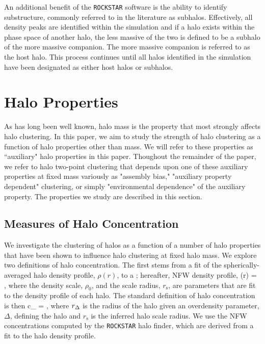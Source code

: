 \documentclass[usenatbib,fleqn]{mnras}
\begin{document}
An additional benefit of the {\tt ROCKSTAR} software is the ability to identify substructure, commonly referred to in the
literature as subhalos. Effectively, all density peaks are identified within the simulation and if a halo exists within the phase
space of another halo, the less massive of the two is defined to be a subhalo of the more massive companion. The more massive companion is 
referred to as the host halo. This process continues until all halos identified in the simulation have been designated as either host halos or subhalos.

\section{Halo Properties}
\label{section:haloprops}

As has long been well known, halo mass is the property that most strongly affects halo clustering. In 
this paper, we aim to study the strength of halo clustering as a function of halo properties other than 
mass. We will refer to these properties as ``auxiliary" halo properties in this paper. Thoughout the remainder of the paper, we refer to halo two-point clustering that depends upon one of these auxiliary properties at fixed mass variously as "assembly bias," "auxiliary property dependent" clustering, or simply "environmental dependence" of the auxiliary property. The properties 
we study are described in this section.

\subsection{Measures of Halo Concentration}

We investigate the clustering of halos as a function of a number of halo properties 
that have been shown to influence halo clustering at fixed halo mass. We explore 
two definitions of halo concentration. The first stems from a fit of the spherically-averaged 
halo density profile, $\rho(r)$, to a \citet{navarro_etal97}; hereafter, NFW density profile, 
%
\beq
\rho(r) = ,
\eeq
%
where the density scale, $\rho_0$, and the scale radius, $r_{\mathrm{s}}$, are parameters 
that are fit to the density profile of each halo. The standard definition of halo concentration is then 
\beq
c_{} = ,
\eeq
where $r_{\Delta}$ is the radius of the halo given an overdensity parameter, $\Delta$, defining the halo 
and $r_{\mathrm{s}}$ is the inferred halo scale radius. We use the NFW concentrations computed by the 
{\tt ROCKSTAR} halo finder, which are derived from a fit to the halo density profile.  
\end{document}
